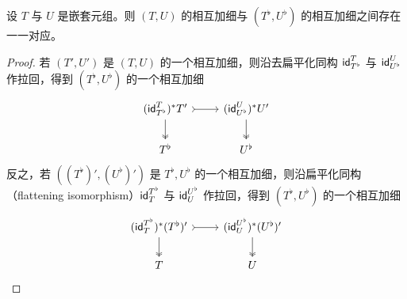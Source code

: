 \begin{lemma}\label{mutualrefinementsofflattenings}
    设 $T$ 与 $U$ 是嵌套元组。则 $(T,U)$ 的相互加细与 $(T^\flat,U^\flat)$ 的相互加细之间存在一一对应。 
\end{lemma}
\begin{proof}
    若 $(T',U')$ 是 $(T,U)$ 的一个相互加细，则沿去扁平化同构 $\mathsf{id}_{T^\flat}^T$ 与 $\mathsf{id}_{U^\flat}^U$ 作拉回，得到 $(T^\flat, U^\flat)$ 的一个相互加细
    \[ \begin{tikzcd} 
 (\id_{T^\flat}^T)^*T' \ar[r,rightarrowtail] \ar[d, two heads] & (\id_{U^\flat}^U)^*U' \ar[d,two heads] \\
T^\flat & U^\flat
\end{tikzcd} \]
    反之，若 $((T^\flat)',(U^\flat)')$ 是 $T^\flat,U^\flat$ 的一个相互加细，则沿扁平化同构（flattening isomorphism）$\mathsf{id}^{T^\flat}_T$ 与 $\mathsf{id}^{U^\flat}_U$ 作拉回，得到 $(T^\flat, U^\flat)$ 的一个相互加细
    \[ \begin{tikzcd} 
 (\id^{T^\flat}_T)^*(T^\flat)' \ar[r,rightarrowtail] \ar[d, two heads] & (\id^{U^\flat}_U)^*(U^\flat)' \ar[d,two heads] \\
T & U
\end{tikzcd} \]
\end{proof}






\newpage 
